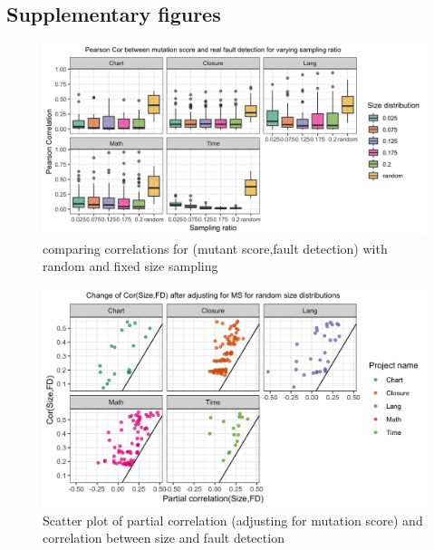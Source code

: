 \documentclass[10pt,letterpaper]{article}
\begin{document}
\subsection*{Supplementary figures}


  \begin{figure}[ht!]
        \centering
        \includegraphics[scale=0.15]{figures/reproduce_fig_3_stratify_size.png}
        \caption{comparing correlations for (mutant score,fault detection) with random and fixed size sampling}
    \end{figure}




  \begin{figure}[ht!]
        \centering
        \includegraphics[scale=0.15]{figures/partial_cor_SIZE_fault_scatter.png}
        \caption{Scatter plot of partial correlation (adjusting for mutation score) and correlation between size and fault detection}
        \label{fig:partial_cor_SIZE_fault_scatter}
    \end{figure}
\end{document}
